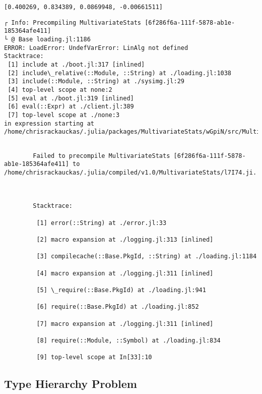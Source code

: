 \documentclass[11pt]{article}
\begin{document}
    \begin{Verbatim}[commandchars=\\\{\}]
[0.400269, 0.834389, 0.0869948, -0.00661511]

    \end{Verbatim}

    \begin{Verbatim}[commandchars=\\\{\}]
┌ Info: Precompiling MultivariateStats [6f286f6a-111f-5878-ab1e-185364afe411]
└ @ Base loading.jl:1186
ERROR: LoadError: UndefVarError: LinAlg not defined
Stacktrace:
 [1] include at ./boot.jl:317 [inlined]
 [2] include\_relative(::Module, ::String) at ./loading.jl:1038
 [3] include(::Module, ::String) at ./sysimg.jl:29
 [4] top-level scope at none:2
 [5] eval at ./boot.jl:319 [inlined]
 [6] eval(::Expr) at ./client.jl:389
 [7] top-level scope at ./none:3
in expression starting at /home/chrisrackauckas/.julia/packages/MultivariateStats/wGpiN/src/MultivariateStats.jl:8

    \end{Verbatim}

    \begin{Verbatim}[commandchars=\\\{\}]

        Failed to precompile MultivariateStats [6f286f6a-111f-5878-ab1e-185364afe411] to /home/chrisrackauckas/.julia/compiled/v1.0/MultivariateStats/l7I74.ji.

        

        Stacktrace:

         [1] error(::String) at ./error.jl:33

         [2] macro expansion at ./logging.jl:313 [inlined]

         [3] compilecache(::Base.PkgId, ::String) at ./loading.jl:1184

         [4] macro expansion at ./logging.jl:311 [inlined]

         [5] \_require(::Base.PkgId) at ./loading.jl:941

         [6] require(::Base.PkgId) at ./loading.jl:852

         [7] macro expansion at ./logging.jl:311 [inlined]

         [8] require(::Module, ::Symbol) at ./loading.jl:834

         [9] top-level scope at In[33]:10

    \end{Verbatim}

    \subsection{Type Hierarchy Problem}\label{type-hierarchy-problem}
\end{document}
